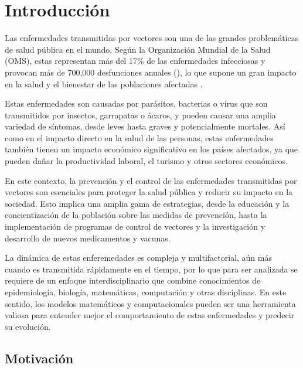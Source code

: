 \chapter*{Introducción}\label{chapter:introduction}

Las enfermedades transmitidas por vectores son una de 
las grandes problemáticas de salud pública en el mundo.
Según la Organización Mundial de la Salud (OMS),
estas representan más del 17\% de las enfermedades infecciosas
y provocan más de 700,000 desfunciones anuales (\cite{who_website2024}),
lo que supone un gran impacto en la salud y el bienestar
de las poblaciones afectadas .
\par
Estas enfermedades son causadas por parásitos,
bacterias o virus que son transmitidos por insectos,
garrapatas o ácaros, y pueden causar una amplia variedad
de síntomas, desde leves hasta graves y potencialmente
mortales. As\'i como en el impacto directo en la salud de
las personas, estas enfermedades también tienen un
impacto económico significativo en los países afectados,
ya que pueden dañar la productividad laboral,
el turismo y otros sectores económicos.
\par
En este contexto, la prevención y el control de las
enfermedades transmitidas por vectores son esenciales
para proteger la salud pública y reducir su impacto
en la sociedad. Esto implica una amplia gama de
estrategias, desde la educación y la concientización
de la población sobre las medidas de prevención,
hasta la implementación de programas de control
de vectores y la investigación y desarrollo de nuevos
medicamentos y vacunas.
\par
La din\'amica de estas enferemedades es compleja y
multifactorial, a\'un m\'as cuando es transmitida r\'apidamente en el tiempo, por lo que
para ser analizada se requiere de un enfoque interdisciplinario que
combine conocimientos de epidemiología,
biología, matemáticas, computaci\'on y otras disciplinas.
En este sentido, los modelos matemáticos y computacionales 
pueden ser una herramienta valiosa para entender mejor
el comportamiento de estas enfermedades y predecir su
evolución.


\section{Motivaci\'on}

